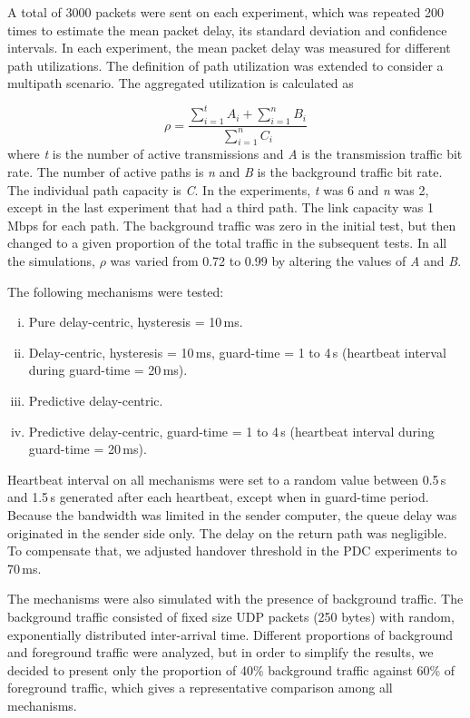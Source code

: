 \documentclass{sbrt2015}
\begin{document}
A total of 3000 packets were sent on each experiment, which was repeated 200 times to estimate the mean packet delay, its standard deviation and confidence intervals. In each experiment, the mean packet delay was measured for different path utilizations. The definition of path utilization was extended to consider a multipath scenario. The aggregated utilization is calculated as 

\begin{equation}
 \rho = \frac{\sum\limits_{i=1}^{t}A_i + \sum\limits_{i=1}^{n}B_i}{\sum\limits_{i=1}^{n}C_i}
\end{equation}
where \textit{t} is the number of active transmissions and \textit{A} is the transmission traffic bit rate. The number of active paths is \textit{n} and \textit{B} is the background traffic bit rate. The individual path capacity is \textit{C}. In the experiments, \textit{t} was 6 and \textit{n} was 2, except in the last experiment that had a third path. The link capacity was 1\,Mbps for each path. 
The background traffic was zero in the initial test, but then changed to a given proportion of the total traffic in the subsequent tests. In all the simulations, $\rho$ was varied from 0.72 to 0.99 by altering the values of \textit{A} and \textit{B}.

The following mechanisms were tested:
\begin{enumerate}[i)]
 \item Pure delay-centric, hysteresis = 10\,ms.
 \item Delay-centric, hysteresis = 10\,ms, guard-time = 1 to 4\,s (heartbeat interval during guard-time = 20\,ms).
 \item Predictive delay-centric.
 \item Predictive delay-centric, guard-time = 1 to 4\,s (heartbeat interval during guard-time = 20\,ms).
\end{enumerate}

Heartbeat interval on all mechanisms were set to a random value between 0.5\,s and 1.5\,s generated after each heartbeat, except when in guard-time period.
Because the bandwidth was limited in the sender computer, the queue delay was originated in the sender side only. The delay on the return path was negligible. To compensate that, we adjusted handover threshold in the PDC experiments to 70\,ms.

The mechanisms were also simulated with the presence of background traffic. The background traffic consisted of fixed size UDP packets (250 bytes) with random, exponentially distributed inter-arrival time. Different proportions of background and foreground traffic were analyzed, but in order to simplify the results, we decided to present only the proportion of 40\% background traffic against 60\% of foreground traffic, which gives a representative comparison among all mechanisms.
\end{document}
